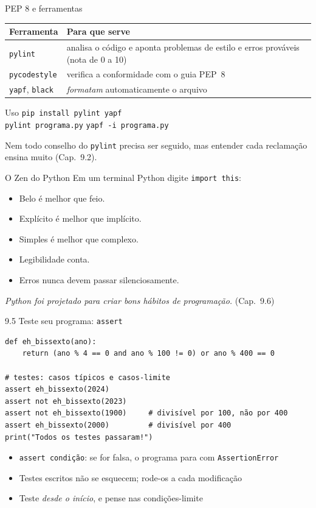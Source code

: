 \documentclass[aspectratio=169,10pt,t]{beamer}
\begin{document}
\begin{frame}{PEP 8 e ferramentas}
  \centering\small
  \begin{tabular}{p{2.6cm}p{8.6cm}}
    \toprule
    Ferramenta & Para que serve\\
    \midrule
    \texttt{pylint} & analisa o código e aponta problemas de estilo e erros prováveis (nota de 0 a 10)\\
    \texttt{pycodestyle} & verifica a conformidade com o guia PEP~8\\
    \texttt{yapf}, \texttt{black} & \emph{formatam} automaticamente o arquivo\\
    \bottomrule
  \end{tabular}
  \vspace{1.5ex}

  \begin{block}{Uso}
    \texttt{pip install pylint yapf}\\
    \texttt{pylint programa.py} \hspace{2em} \texttt{yapf -i programa.py}
  \end{block}
  \footnotesize Nem todo conselho do \texttt{pylint} precisa ser seguido, mas entender cada reclamação ensina muito (Cap.~9.2).
\end{frame}

\begin{frame}[fragile]{O Zen do Python}
  Em um terminal Python digite \texttt{import this}:
  \begin{itemize}
    \item Belo é melhor que feio.
    \item Explícito é melhor que implícito.
    \item Simples é melhor que complexo.
    \item Legibilidade conta.
    \item Erros nunca devem passar silenciosamente.
  \end{itemize}
  \vspace{1ex}
  \small\emph{Python foi projetado para criar bons hábitos de programação.} (Cap.~9.6)
\end{frame}

\begin{frame}[fragile]{9.5 Teste seu programa: \texttt{assert}}
\begin{lstlisting}
def eh_bissexto(ano):
    return (ano % 4 == 0 and ano % 100 != 0) or ano % 400 == 0

# testes: casos típicos e casos-limite
assert eh_bissexto(2024)
assert not eh_bissexto(2023)
assert not eh_bissexto(1900)     # divisível por 100, não por 400
assert eh_bissexto(2000)         # divisível por 400
print("Todos os testes passaram!")
\end{lstlisting}
  \begin{itemize}
    \item \texttt{assert condição}: se for falsa, o programa para com \texttt{AssertionError}
    \item Testes escritos \alert{não} se esquecem; rode-os a cada modificação
    \item Teste \emph{desde o início}, e pense nas condições-limite
  \end{itemize}
\end{frame}
\end{document}
